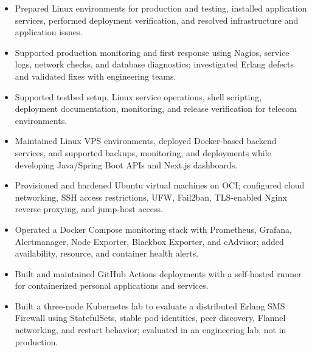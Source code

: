 \begin{itemize}
\item Prepared Linux environments for production and testing, installed application services, performed deployment verification, and resolved infrastructure and application issues.
\item Supported production monitoring and first response using Nagios, service logs, network checks, and database diagnostics; investigated Erlang defects and validated fixes with engineering teams.
\end{itemize}

\newpage
{}
\begin{itemize}
\item Supported testbed setup, Linux service operations, shell scripting, deployment documentation, monitoring, and release verification for telecom environments.
\end{itemize}

\begin{itemize}
\item Maintained Linux VPS environments, deployed Docker-based backend services, and supported backups, monitoring, and deployments while developing Java/Spring Boot APIs and Next.js dashboards.
\end{itemize}

\begin{itemize}
\item Provisioned and hardened Ubuntu virtual machines on OCI; configured cloud networking, SSH access restrictions, UFW, Fail2ban, TLS-enabled Nginx reverse proxying, and jump-host access.
\item Operated a Docker Compose monitoring stack with Prometheus, Grafana, Alertmanager, Node Exporter, Blackbox Exporter, and cAdvisor; added availability, resource, and container health alerts.
\item Built and maintained GitHub Actions deployments with a self-hosted runner for containerized personal applications and services.
\end{itemize}

\begin{itemize}
\item Built a three-node Kubernetes lab to evaluate a distributed Erlang SMS Firewall using StatefulSets, stable pod identities, peer discovery, Flannel networking, and restart behavior; evaluated in an engineering lab, not in production.
\end{itemize}

